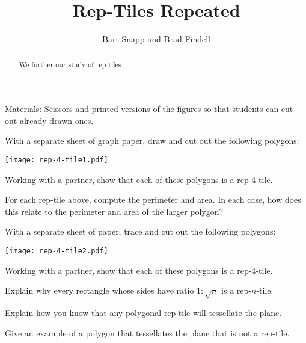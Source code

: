 \documentclass[nooutcomes]{ximera}
\title{Rep-Tiles Repeated}
\author{Bart Snapp and Brad Findell}
\begin{document}
\begin{abstract}
  We further our study of rep-tiles.
\end{abstract}
\maketitle


\begin{teachingnote}
Materials:  Scissors and printed versions of the figures so that students can cut out already drawn ones.   
\end{teachingnote}

\begin{problem}
With a separate sheet of graph paper, draw and cut out the following polygons:
\begin{image}
\texttt{[image: rep-4-tile1.pdf]}
\end{image}
Working with a partner, show that each of these polygons is a rep-4-tile.
\end{problem}

\begin{problem}
For each rep-tile above, compute the perimeter and area. In each case,
how does this relate to the perimeter and area of the larger polygon?
\vfill
\end{problem}


\begin{problem}
With a separate sheet of paper, trace and cut out the following
polygons:
\begin{image}
\texttt{[image: rep-4-tile2.pdf]}
\end{image}
Working with a partner, show that each of these polygons is a rep-4-tile.
\end{problem}

\newpage

\begin{problem}
Explain why every rectangle whose sides have ratio $1:\sqrt{n}$ is a
rep-$n$-tile.
\vfill
\end{problem}

\begin{problem}
Explain how you know that any polygonal rep-tile will tessellate the plane.
\vfill
\end{problem}

\begin{problem}
Give an example of a polygon that tessellates the plane that is not a
rep-tile.
\vfill
\end{problem}

\newpage
\end{document}
